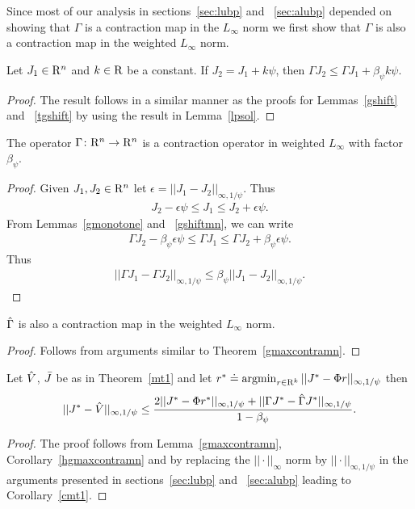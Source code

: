 Since most of our analysis in sections~\ref{sec:lubp} and ~\ref{sec:alubp} depended on showing that $\Gamma$ is a contraction map in the $L_\infty$ norm we first show that $\Gamma$ is also a contraction map in the weighted $L_\infty$ norm.
\begin{lemma}\label{gshiftmn}
Let $J_1\in \mathrm{R}^n$ and $k\in \mathrm{R}$ be a constant. If $J_2=J_1+k\psi$, then $\Gamma J_2\leq \Gamma J_1+\beta_{\psi} k\psi$.
\end{lemma}
\begin{proof}
The result follows in a similar manner as the proofs for Lemmas~\ref{gshift} and ~\ref{tgshift} by using the result in Lemma~\ref{lpsol}.
\end{proof}
\begin{theorem}\label{gmaxcontramn}
The operator $\Gamma  \colon \mathrm{R}^n\rightarrow \mathrm{R}^n$ is a contraction operator in weighted $L_\infty$ with factor $\beta_{\psi}$.
\end{theorem}
\begin{proof}
Given $J_1,J_2\in \mathrm{R}^n$ let $\epsilon=||J_1-J_2||_{\infty,1/\psi}$. Thus
\begin{align}\label{ineq}
J_2-\epsilon\psi\leq J_1\leq J_2+\epsilon \psi.
\end{align}
From Lemmas~\ref{gmonotone} and ~\ref{gshiftmn}, we can write
\begin{align}\label{ineq}
\Gamma J_2-\beta_{\psi} \epsilon\psi\leq \Gamma J_1\leq \Gamma J_2+\beta_{\psi} \epsilon\psi.
\end{align}
Thus
\begin{align}
||\Gamma J_1-\Gamma J_2||_{\infty,1/\psi}\leq \beta_{\psi} ||J_1-J_2||_{\infty,1/\psi}.
\end{align}
\end{proof}
\begin{corollary}\label{hgmaxcontramn}
$\hat{\Gamma}$ is also a contraction map in the weighted $L_\infty$ norm.
\end{corollary}
\begin{proof}
Follows from arguments similar to Theorem~\ref{gmaxcontramn}.
\end{proof}
\begin{lemma}\label{cmt1mn}
Let $\hat{V}$, $\bar{J}$ be as in Theorem~\ref{mt1} and let $r^*\doteq\operatorname{argmin}_{r\in \mathrm{R}^k}||J^*-\Phi r||_{\infty,1/\psi}$ then
\begin{align}
||J^*-\hat{V}||_{\infty,1/\psi}\leq \frac{2||J^*-\Phi r^*||_{\infty,1/\psi}+||\Gamma J^*-\hat{\Gamma} J^*||_{\infty,1/\psi}}{1-\beta_{\psi}}.
\end{align}
\end{lemma}
\begin{proof}
The proof follows from Lemma~\ref{gmaxcontramn}, Corollary~\ref{hgmaxcontramn} and by replacing the $||\cdot||_\infty$ norm by $||\cdot||_{\infty,1/\psi}$ in the arguments presented in sections~\ref{sec:lubp} and ~\ref{sec:alubp} leading to Corollary~\ref{cmt1}.
\end{proof}

